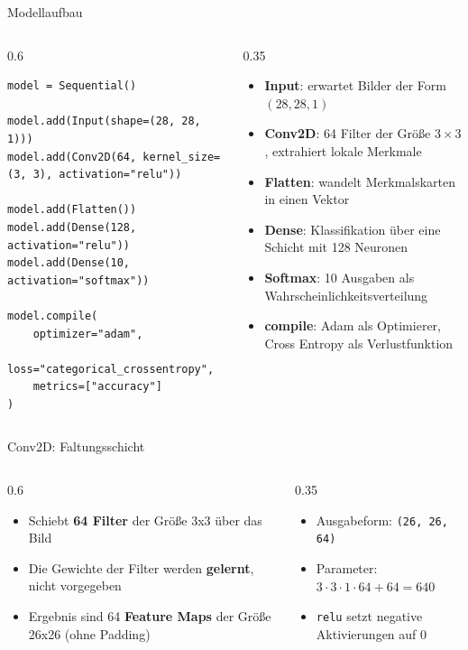 \begin{frame}[fragile]{Modellaufbau}
\begin{columns}
\begin{column}{0.6\textwidth}
\begin{verbatim}
model = Sequential()

model.add(Input(shape=(28, 28, 1)))
model.add(Conv2D(64, kernel_size=(3, 3), activation="relu"))

model.add(Flatten())
model.add(Dense(128, activation="relu"))
model.add(Dense(10, activation="softmax"))

model.compile(
    optimizer="adam",
    loss="categorical_crossentropy",
    metrics=["accuracy"]
)
\end{verbatim}
\end{column}
\begin{column}{0.35\textwidth}
\footnotesize
\begin{itemize}
  \item \textbf{Input}: erwartet Bilder der Form $(28,28,1)$
  \item \textbf{Conv2D}: 64 Filter der Größe $3 \times 3$, extrahiert lokale Merkmale
  \item \textbf{Flatten}: wandelt Merkmalskarten in einen Vektor
  \item \textbf{Dense}: Klassifikation über eine Schicht mit 128 Neuronen
  \item \textbf{Softmax}: 10 Ausgaben als Wahrscheinlichkeitsverteilung
  \item \textbf{compile}: Adam als Optimierer, Cross Entropy als Verlustfunktion
\end{itemize}
\end{column}
\end{columns}
\end{frame}

\begin{frame}{Conv2D: Faltungsschicht}
\begin{columns}
\begin{column}{0.6\linewidth}
\begin{itemize}
  \item Schiebt \textbf{64 Filter} der Größe 3x3 über das Bild
  \item Die Gewichte der Filter werden \textbf{gelernt}, nicht vorgegeben
  \item Ergebnis sind 64 \textbf{Feature Maps} der Größe 26x26 (ohne Padding)
\end{itemize}
\end{column}
\begin{column}{0.35\linewidth}
\begin{itemize}
  \item Ausgabeform: \texttt{(26, 26, 64)}
  \item Parameter: $3 \cdot 3 \cdot 1 \cdot 64 + 64 = 640$
  \item \texttt{relu} setzt negative Aktivierungen auf 0
\end{itemize}
\end{column}
\end{columns}
\end{frame}

